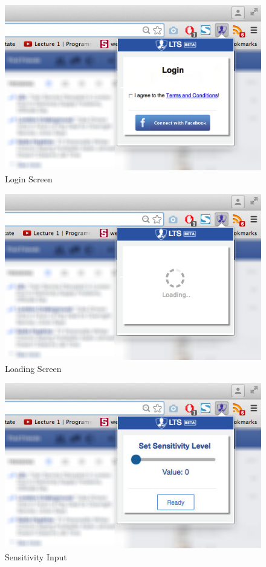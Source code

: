 \documentclass[a4paper,11pt]{article}
\begin{document}
\vspace{1mm}
\begin{figure}[H]
	\centering
	\includegraphics[scale=0.52]{APpendix/LoginScreen}
	\caption{Login Screen}
\end{figure}

\begin{figure}[H]
	\centering
	\includegraphics[scale=0.52]{APpendix/LoadingScreen}
	\caption{Loading Screen}
\end{figure}

\begin{figure}[H]
	\centering
	\includegraphics[scale=0.52]{APpendix/SenInput}
	\caption{Sensitivity Input}
\end{figure}
\end{document}
